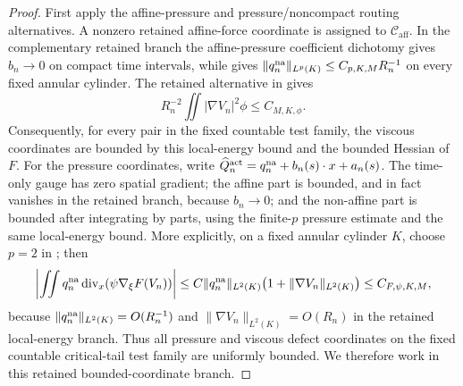 \documentclass[11pt]{amsart}
\numberwithin{equation}{section}
\theoremstyle{plain}
\theoremstyle{definition}
\theoremstyle{remark}
\newcommand{\Caff}{\mathcal C_{\mathrm{aff}}}
\begin{document}
\begin{proof}
First apply the affine-pressure and pressure/noncompact routing alternatives.  A
nonzero retained affine-force coordinate is assigned to \(\Caff\).  In the
complementary retained branch the affine-pressure coefficient dichotomy gives
\(b_n\to0\) on compact time intervals, while
 gives
\(\|q_n^{\rm na}\|_{L^p(K)}\le C_{p,K,M}R_n^{-1}\) on every fixed annular
cylinder.  The retained alternative in
 gives
\[
   R_n^{-2}\iint |\nabla V_n|^2\phi\le C_{M,K,\phi}.
\]
Consequently, for every pair in the fixed countable test family, the viscous
coordinates are bounded by this local-energy bound and the bounded Hessian of
\(F\).  For the pressure coordinates, write
\(\widehat Q_n^{\rm act}=q_n^{\rm na}+b_n(s)\cdot x+a_n(s)\).  The time-only
gauge has zero spatial gradient; the affine part is bounded, and in fact
vanishes in the retained branch, because \(b_n\to0\); and the non-affine part is
bounded after integrating by parts, using the finite-\(p\) pressure estimate and
the same local-energy bound.  More explicitly, on a fixed annular cylinder \(K\),
choose \(p=2\) in ; then
\[
   \left|\iint q_n^{\rm na}
      \operatorname{div}_x(\psi\nabla_\xi F(V_n))\right|
   \le
   C\|q_n^{\rm na}\|_{L^2(K)}
   \bigl(1+\|\nabla V_n\|_{L^2(K)}\bigr)
   \le C_{F,\psi,K,M},
\]
because \(\|q_n^{\rm na}\|_{L^2(K)}=O(R_n^{-1})\) and
\(\|\nabla V_n\|_{L^2(K)}=O(R_n)\) in the retained local-energy branch.  Thus
all pressure and viscous defect coordinates on the fixed countable
critical-tail test family are uniformly bounded.  We therefore work in this
retained bounded-coordinate branch.


\end{proof}
\end{document}
